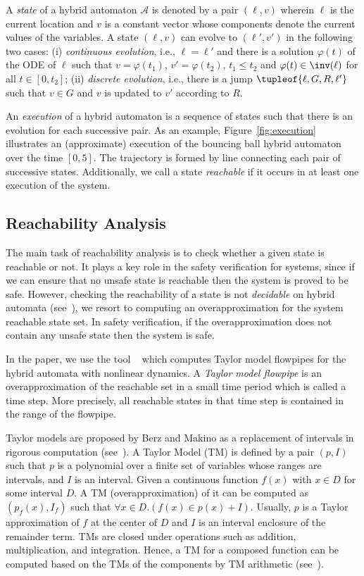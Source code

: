 A \emph{state} of a hybrid automaton $\mathcal{A}$ is denoted by a pair $(\ell, v)$ wherein $\ell$ is the current location and $v$ is a constant vector whose components denote the current values of the variables. A state $(\ell,v)$ can evolve to $(\ell', v')$ in the following two cases: (i) \emph{continuous evolution}, i.e., $\ell = \ell'$ and there is a solution $\varphi(t)$ of the ODE of $\ell$ such that $v = \varphi(t_1)$, $v' = \varphi(t_2)$, $t_1 \leq t_2$ and $\varphi(t) \in \inv(\ell)$ for all $t \in [0,t_2]$; (ii) \emph{discrete evolution}, i.e., there is a jump $\tupleof{\ell, G, R, \ell'}$ such that $v\in G$ and $v$ is updated to $v'$ according to $R$.

An \emph{execution} of a hybrid automaton is a sequence of states such that there is an evolution for each successive pair. As an example, Figure~\ref{fig:execution} illustrates an (approximate) execution of the bouncing ball hybrid automaton over the time $[0,5]$. The trajectory is formed by line connecting each pair of successive states. Additionally, we call a state \emph{reachable} if it occurs in at least one execution of the system.




\subsection{Reachability Analysis}

The main task of reachability analysis is to check whether a given state is reachable or not. It plays a key role in the safety verification for systems, since if we can ensure that no unsafe state is reachable then the system is proved to be safe. However, checking the reachability of a state is not \emph{decidable} on hybrid automata (see~\cite{Alur+/1995/hybrid_systems}), we resort to computing an overapproximation for the system reachable state set. In safety verification, if the overapproximation does not contain any unsafe state then the system is safe.


In the paper, we use the tool \flowstar~\cite{Chen+/2013/flowstar} which computes Taylor model flowpipes for the hybrid automata with nonlinear dynamics. A \emph{Taylor model flowpipe} is an overapproximation of the reachable set in a small time period which is called a time step. More precisely, all reachable states in that time step is contained in the range of the flowpipe.


Taylor models are proposed by Berz and Makino as a replacement of intervals in rigorous computation (see~\cite{Berz/1999/Modern,Makino+Berz/2003/Taylor}). A Taylor Model (TM) is defined by a pair $(p,I)$ such that $p$ is a polynomial over a finite set of variables whose ranges are intervals, and $I$ is an interval. Given a continuous function $f(x)$ with $x\in D$ for some interval $D$. A TM (overapproximation) of it can be computed as $(p_f(x), I_f)$ such that $\forall x\in D.(f(x) \in p(x) + I)$. Usually, $p$ is a Taylor approximation of $f$ at the center of $D$ and $I$ is an interval enclosure of the remainder term. TMs are closed under operations such as addition, multiplication, and integration. Hence, a TM for a composed function can be computed based on the TMs of the components by TM arithmetic (see~\cite{Makino+Berz/2003/Taylor}).



